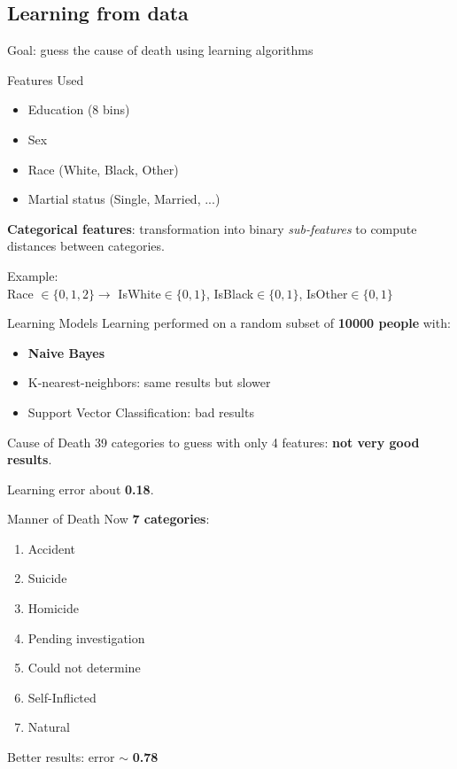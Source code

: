 \documentclass[xcolor=table]{beamer}
\begin{document}
\subsection{Learning from data}
\begin{frame}
  Goal: guess the cause of death using learning algorithms
\end{frame}

\begin{frame}{Features Used}
\begin{itemize}
  \item Education (8 bins)
  \item Sex
  \item Race (White, Black, Other)
  \item Martial status (Single, Married, ...)
\end{itemize}

\bigskip

\textbf{Categorical features}: transformation into binary \textit{sub-features} to compute distances between categories.

Example: \\
{\small Race $\in \{0,1,2\} \longrightarrow $ IsWhite$\in \{0,1\}$, IsBlack$\in \{0,1\}$, IsOther$\in \{0,1\}$}
\end{frame}


\begin{frame}{Learning Models}
  Learning performed on a random subset of \textbf{10000 people} with:
  \begin{itemize}
    \item \textbf{Naive Bayes}
    \item K-nearest-neighbors: same results but slower
    \item Support Vector Classification: bad results
  \end{itemize}
\end{frame}


\begin{frame}{Cause of Death}
  39 categories to guess with only 4 features: \textbf{not very good results}.
  
  \bigskip
  
  Learning error about \textbf{0.18}.
\end{frame}

\begin{frame}{Manner of Death}
  Now \textbf{7 categories}:
  \begin{enumerate}
    \item Accident
    \item Suicide
    \item Homicide
    \item Pending investigation
    \item Could not determine
    \item Self-Inflicted
    \item Natural
  \end{enumerate}
  
  \bigskip
  
  Better results: error $\sim$ \textbf{0.78}
\end{frame}
\end{document}
